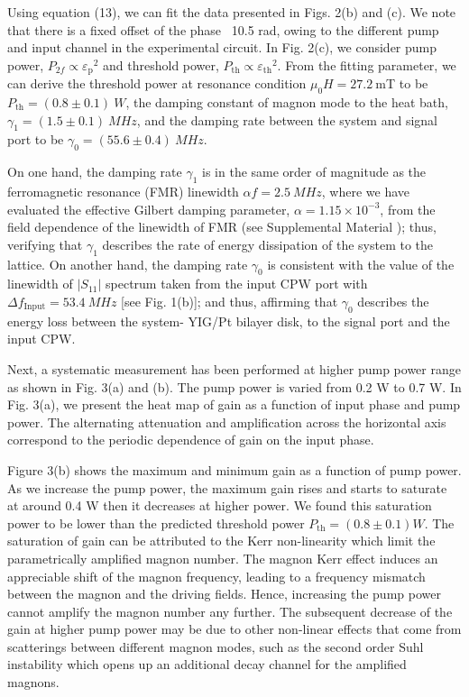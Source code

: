 \documentclass[%
 reprint,
 amsmath,amssymb,
 aps,
prb,
]{revtex4-2}
\begin{document}
Using equation (13), we can fit the data presented in Figs. 2(b) and (c). We note that there is a fixed offset of the phase ~10.5 rad, owing to the different pump and input channel in the experimental circuit. In Fig. 2(c), we consider pump power, $P_{2f}\propto{\varepsilon_\mathrm{p}}^2$ and threshold power, $P_{\mathrm{th}}\propto{\varepsilon_{\mathrm{th}}}^2$. From the fitting parameter, we can derive the threshold power at resonance condition  $\mu_0H=27.2\ $mT to be $P_{\mathrm{th}}=\left(0.8\pm0.1\right)\ \si{W} $, the damping constant of magnon mode to the heat bath, $\gamma_1=(1.5\pm0.1)\ \si{MHz}$, and the damping rate between the system and signal port to be $\gamma_0=(55.6\pm0.4)\ \si{MHz}$.  

On one hand, the damping rate  $\gamma_1$ is in the same order of magnitude as the ferromagnetic resonance (FMR) linewidth $\alpha f= 2.5\ \si{MHz}$, where we have evaluated the effective Gilbert damping parameter, $\alpha= 1.15 \times 10^{-3}$, from the field dependence of the linewidth of FMR (see Supplemental Material \cite{Suppl}); thus, verifying that $\gamma_1$ describes the rate of energy dissipation of the system to the lattice. On another hand, the damping rate $\gamma_0$ is consistent with the value of the linewidth of $|S_{11}|$ spectrum taken from the input CPW port with $\Delta f_\mathrm{Input} = 53.4\ \si{MHz}$ [see Fig. 1(b)]; and thus, affirming that $\gamma_0$ describes the energy loss between the system- YIG/Pt bilayer disk, to the signal port and the input CPW. 

Next, a systematic measurement has been performed at higher pump power range as shown in Fig. 3(a) and (b). The pump power is varied from 0.2 W to 0.7 W. In Fig. 3(a), we present the heat map of gain as a function of input phase and pump power. The alternating attenuation and amplification across the horizontal axis correspond to the periodic dependence of gain on the input phase. 

Figure 3(b) shows the maximum and minimum gain as a function of pump power. As we increase the pump power, the maximum gain rises and starts to saturate at around 0.4 W then it decreases at higher power. We found this saturation power to be lower than the  predicted threshold power $P_{\mathrm{th}}= (0.8 \pm 0.1) \si{W} $. The saturation of gain can be attributed to the Kerr non-linearity which limit the parametrically amplified magnon number\cite{Elyasi2022,YUAN2022,Zakharov1975,Lvov}. The magnon Kerr effect induces an appreciable shift of the magnon frequency\cite{Wang2016}, leading to a frequency mismatch between the magnon and the driving fields. Hence, increasing the pump power cannot amplify the magnon number any further. The subsequent decrease of the gain at higher pump power may be due to other non-linear effects that come from scatterings between different magnon modes, such as the second order Suhl instability which opens up an additional decay channel for the amplified magnons\cite{Rez1990,SUHL1957,Lvov}.
\end{document}
